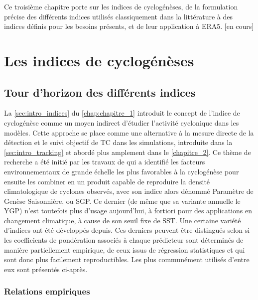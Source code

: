 \documentclass[../main.tex]{subfiles}
\begin{document}
\begin{itshape}
    Ce troisième chapitre porte sur les indices de cyclogénèses, de la formulation précise des différents indices utilisés classiquement dans la littérature à
    des indices définis pour les besoins présents, et de leur application à ERA5. [en cours]
\end{itshape}

\minitoc
\newpage
\section{Les indices de cyclogénèses}\label{sec:intro_chap3}

\subsection{Tour d'horizon des différents indices}\label{sec:tour_horizon_indices}

La \cref{sec:intro_indices} du \cref{chap:chapitre_1} introduit le concept de l'indice de cyclogénèse comme un moyen indirect d'étudier l'activité cyclonique
dans les modèles. Cette approche se place comme une alternative à la mesure directe de la détection et le suivi objectif de TC dans les simulations, introduite
dans la \cref{sec:intro_tracking} et abordé plus amplement dans le \cref{chapitre_2}. Ce thème de recherche a été initié par les travaux de
\textcite{gray_global_1968,gray_tropical_1975} qui a identifié les facteurs environnementaux de grande échelle les plus favorables à la cyclogénèse pour ensuite
les combiner en un produit capable de reproduire la densité climatologique de cyclones observés, avec son indice alors dénommé Paramètre de Genèse Saisonnière,
ou SGP. Ce dernier (de même que sa variante annuelle le YGP) n'est toutefois plus d'usage aujourd'hui, à fortiori pour des applications en changement
climatique, à cause de son seuil fixe de SST. Une certaine variété d'indices ont été développés depuis. Ces derniers peuvent être distingués selon si les
coefficients de pondération associés à chaque prédicteur sont déterminés de manière partiellement empirique, de ceux issus de régression statistiques et qui
sont donc plus facilement reproductibles. Les plus communément utilisés d'entre eux sont présentés ci-après.

\subsubsection{Relations empiriques}\label{sec:relations_empiriques}
\end{document}

